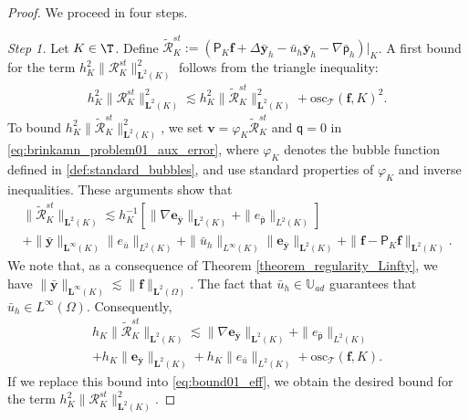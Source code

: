 \documentclass[final]{siamart0216}
\begin{document}
\begin{proof}
We proceed in four steps.

\emph{Step 1.} Let $K\in\T$. Define $\tilde{\mathcal{R}}_{K}^{st}:=(\mathsf{P}_{K}\mathbf{f}+\Delta \bar{\mathbf{y}}_{h}-\bar{u}_{h}\bar{\mathbf{y}}_{h}-\nabla\bar{\mathsf{p}}_{h})|_K$. A first bound for the term $h_K^2\|\mathcal{R}_{K}^{st}\|_{\mathbf{L}^2(K)}^2$ follows from the triangle inequality:
\begin{align}\label{eq:bound01_eff}
h_K^2\|\mathcal{R}_{K}^{st}\|_{\mathbf{L}^2(K)}^2\lesssim h_K^2 \|\tilde{\mathcal{R}}_{K}^{st}\|_{\mathbf{L}^2(K)}^2 + \text{osc}_{\mathscr{T}}(\mathbf{f},K)^2.
\end{align}
To bound $h_K^2 \|\tilde{\mathcal{R}}_{K}^{st}\|_{\mathbf{L}^2(K)}^2$, we set $\mathbf{v}=\varphi_K \tilde{\mathcal{R}}_{K}^{st}$ and $\mathsf{q}=0$ in \eqref{eq:brinkamn_problem01_aux_error}, where $\varphi_K $ denotes the bubble function defined in \eqref{def:standard_bubbles}, and use standard properties of $\varphi_K$ and inverse inequalities. These arguments show that
\begin{multline}\label{eq:bound02_eff}
\|\tilde{\mathcal{R}}_{K}^{st}\|_{\mathbf{L}^2(K)} \lesssim h_{K}^{-1} [\|\nabla \mathbf{e}_{\bar{\mathbf{y}}}\|_{\mathbf{L}^2(K)}
+
\| e_{\bar{\mathsf{p}}} \|_{L^2(K)}]
\\
+
\|\bar{\mathbf{y}}\|_{\mathbf{L}^{\infty}(K)}\|e_{\bar{u}}\|_{L^2(K)}
+
\|\bar{u}_{h}\|_{L^{\infty}(K)}\| \mathbf{e}_{\bar{\mathbf{y}}}\|_{\mathbf{L}^2(K)}+\|\mathbf{f}-\mathsf{P}_{K}\mathbf{f}\|_{\mathbf{L}^2(K)}.
\end{multline}
We note that, as a consequence of Theorem \ref{theorem_regularity_Linfty}, we have $\|\bar{\mathbf{y}}\|_{\mathbf{L}^{\infty}(K)}\lesssim \|\mathbf{f}\|_{\mathbf{L}^2(\Omega)}$. The fact that $\bar{u}_h\in \mathbb{U}_{ad}$ guarantees that $\bar{u}_h \in L^{\infty}(\Omega)$. Consequently,
\begin{multline}\label{eq:bound03_eff}
h_K\|\tilde{\mathcal{R}}_{K}^{st}\|_{\mathbf{L}^2(K)}  
\lesssim  
\|\nabla \mathbf{e}_{\bar{\mathbf{y}}}\|_{\mathbf{L}^2(K)}
+\| e_{\bar{\mathsf{p}}} \|_{L^2(K)}
\\
+
h_K\| \mathbf{e}_{\bar{\mathbf{y}}}\|_{\mathbf{L}^2(K)}
+
h_K \|e_{\bar{u}}\|_{L^2(K)}
+
\text{osc}_{\mathscr{T}}(\mathbf{f},K).
\end{multline}
If we replace this bound into \eqref{eq:bound01_eff}, we obtain the desired bound for the term $h_K^2 \|\mathcal{R}_{K}^{st}\|_{\mathbf{L}^2(K)}^2$.


\end{proof}
\end{document}
